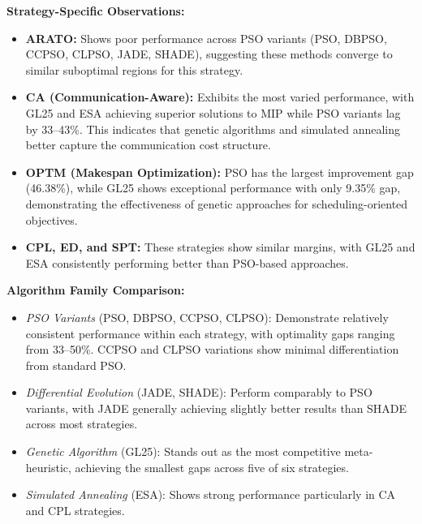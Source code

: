\noindent
\textbf{Strategy-Specific Observations:}
\begin{itemize}
    \item \textbf{ARATO:} Shows poor performance across PSO variants (PSO, DBPSO, CCPSO, CLPSO, JADE, SHADE), suggesting these methods converge to similar suboptimal regions for this strategy.
    
    \item \textbf{CA (Communication-Aware):} Exhibits the most varied performance, with GL25 and ESA achieving superior solutions to MIP while PSO variants lag by 33--43\%. This indicates that genetic algorithms and simulated annealing better capture the communication cost structure.
    
    \item \textbf{OPTM (Makespan Optimization):} PSO has the largest improvement gap (46.38\%), while GL25 shows exceptional performance with only 9.35\% gap, demonstrating the effectiveness of genetic approaches for scheduling-oriented objectives.
    
    \item \textbf{CPL, ED, and SPT:} These strategies show similar margins, with GL25 and ESA consistently performing better than PSO-based approaches.
\end{itemize}

\textbf{Algorithm Family Comparison:}
\begin{itemize}
    \item \textit{PSO Variants} (PSO, DBPSO, CCPSO, CLPSO): Demonstrate relatively consistent performance within each strategy, with optimality gaps ranging from 33--50\%. CCPSO and CLPSO variations show minimal differentiation from standard PSO.
    
    \item \textit{Differential Evolution} (JADE, SHADE): Perform comparably to PSO variants, with JADE generally achieving slightly better results than SHADE across most strategies.
    
    \item \textit{Genetic Algorithm} (GL25): Stands out as the most competitive meta-heuristic, achieving the smallest gaps across five of six strategies.
    
    \item \textit{Simulated Annealing} (ESA): Shows strong performance particularly in CA and CPL strategies.
\end{itemize}


